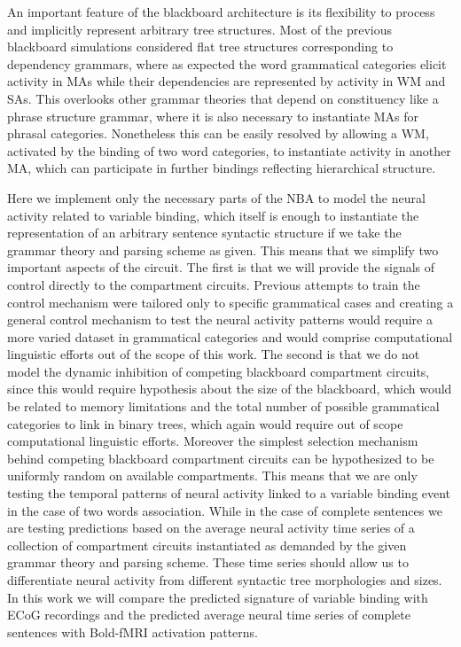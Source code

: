 \documentclass[10pt]{article}
\begin{document}
An important feature of the blackboard architecture is its flexibility
to process and implicitly represent arbitrary tree structures. Most of
the previous blackboard simulations considered flat tree structures
corresponding to dependency grammars\cite{nivre2005dependency}, where as
expected the word grammatical categories elicit activity in MAs while
their dependencies are represented by activity in WM and SAs. This
overlooks other grammar theories that depend on constituency like a
phrase structure grammar\cite{gazdar1982phrase}, where it is also necessary
to instantiate MAs for phrasal categories. Nonetheless this can be
easily resolved by allowing a WM, activated by the binding of two word
categories, to instantiate activity in another MA, which can participate
in further bindings reflecting hierarchical structure.

Here we implement only the necessary parts of the NBA to model the
neural activity related to variable binding, which itself is enough to
instantiate the representation of an arbitrary sentence syntactic
structure if we take the grammar theory and parsing scheme as given.
This means that we simplify two important aspects of the circuit. The
first is that we will provide the signals of control directly to the
compartment circuits. Previous attempts to train the control
mechanism\cite{van_der_Velde_2010} were tailored only to specific grammatical
cases and creating a general control mechanism to test the neural
activity patterns would require a more varied dataset in grammatical
categories and would comprise computational linguistic efforts out of
the scope of this work. The second is that we do not model the dynamic
inhibition of competing blackboard compartment circuits, since this
would require hypothesis about the size of the blackboard, which would
be related to memory limitations and the total number of possible
grammatical categories to link in binary trees, which again would
require out of scope computational linguistic efforts. Moreover the
simplest selection mechanism behind competing blackboard compartment
circuits can be hypothesized to be uniformly random on available
compartments. This means that we are only testing the temporal patterns
of neural activity linked to a variable binding event in the case of two
words association. While in the case of complete sentences we are
testing predictions based on the average neural activity time series of
a collection of compartment circuits instantiated as demanded by the
given grammar theory and parsing scheme. These time series should allow
us to differentiate neural activity from different syntactic tree
morphologies and sizes. In this work we will compare the predicted
signature of variable binding with ECoG recordings and the predicted
average neural time series of complete sentences with Bold-fMRI
activation patterns.
\end{document}
